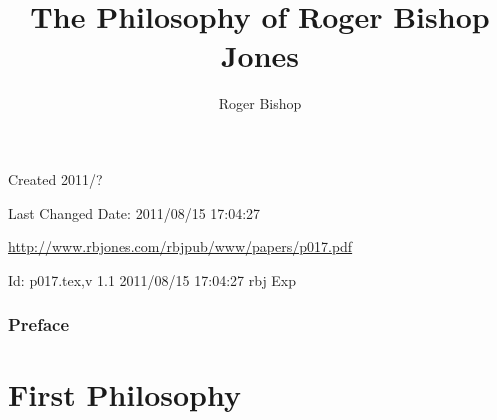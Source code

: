 \documentclass{rbjk}
\begin{document}
                                                                                   
\begin{article}
\begin{opening}  
\title{The Philosophy of Roger Bishop Jones}
\author{Roger Bishop }

\begin{abstract}

\end{abstract}
\end{opening}

\vfill

\begin{centering}
{\footnotesize
Created 2011/?

Last Changed $ $Date: 2011/08/15 17:04:27 $ $

\href{http://www.rbjones.com/rbjpub/www/papers/p017.pdf}
{http://www.rbjones.com/rbjpub/www/papers/p017.pdf}

$ $Id: p017.tex,v 1.1 2011/08/15 17:04:27 rbj Exp $ $

}%
\end{centering}

\newpage
\setcounter{tocdepth}{4}
{\parskip-0pt\tableofcontents}

\section{Preface}


\part{First Philosophy}

%
%

\end{article}
\end{document}
